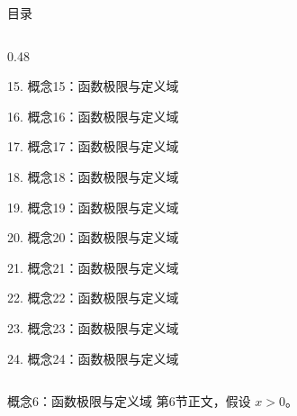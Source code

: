 \documentclass[aspectratio=169,10pt,fontset=fandol]{ctexbeamer}
\begin{document}
\begin{frame}[t,fragile]{目录}
\begin{columns}[T,onlytextwidth]
\begin{column}{0.48\textwidth}
{\color{gray!40}\small 15. 概念15：函数极限与定义域\par}\vspace{0.22em}
{\color{gray!40}\small 16. 概念16：函数极限与定义域\par}\vspace{0.22em}
{\color{gray!40}\small 17. 概念17：函数极限与定义域\par}\vspace{0.22em}
{\color{gray!40}\small 18. 概念18：函数极限与定义域\par}\vspace{0.22em}
{\color{gray!40}\small 19. 概念19：函数极限与定义域\par}\vspace{0.22em}
{\color{gray!40}\small 20. 概念20：函数极限与定义域\par}\vspace{0.22em}
{\color{gray!40}\small 21. 概念21：函数极限与定义域\par}\vspace{0.22em}
{\color{gray!40}\small 22. 概念22：函数极限与定义域\par}\vspace{0.22em}
{\color{gray!40}\small 23. 概念23：函数极限与定义域\par}\vspace{0.22em}
{\color{gray!40}\small 24. 概念24：函数极限与定义域\par}\vspace{0.22em}
\end{column}
\end{columns}
\end{frame}
\begin{frame}[t,fragile]{概念6：函数极限与定义域}
\normalsize
{\normalsize
第6节正文，假设 $x>0$。
}
\end{frame}
\end{document}
